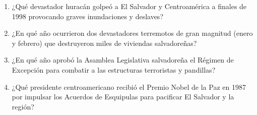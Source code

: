 \documentclass[10pt,a4paper]{article}
\begin{document}
\begin{enumerate}[label=\textbf{\arabic*.}]
\begin{enumerate}[label=\textbf{\Alph*)}]
\end{enumerate}
\vspace{0.15cm}
\item ¿Qué devastador huracán golpeó a El Salvador y Centroamérica a finales de 1998 provocando graves inundaciones y deslaves?
\begin{enumerate}[label=\textbf{\Alph*)}]
\end{enumerate}
\vspace{0.15cm}
\item ¿En qué año ocurrieron dos devastadores terremotos de gran magnitud (enero y febrero) que destruyeron miles de viviendas salvadoreñas?
\begin{enumerate}[label=\textbf{\Alph*)}]
\end{enumerate}
\vspace{0.15cm}
\item ¿En qué año aprobó la Asamblea Legislativa salvadoreña el Régimen de Excepción para combatir a las estructuras terroristas y pandillas?
\begin{enumerate}[label=\textbf{\Alph*)}]
\end{enumerate}
\vspace{0.15cm}
\item ¿Qué presidente centroamericano recibió el Premio Nobel de la Paz en 1987 por impulsar los Acuerdos de Esquipulas para pacificar El Salvador y la región?
\begin{enumerate}[label=\textbf{\Alph*)}]

\end{enumerate}
\end{enumerate}
\end{document}
